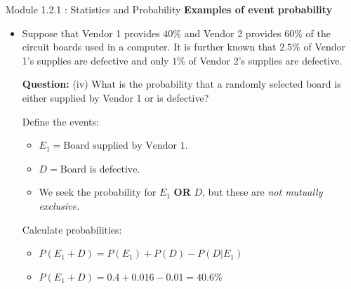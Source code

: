 \documentclass{beamer}
\begin{document}
\begin{frame}{Module 1.2.1 : Statistics and Probability}
\small
\textbf{Examples of event probability}
\begin{itemize}
\item
\scriptsize
Suppose that Vendor 1 provides $40\%$ and Vendor 2 provides $60\%$ of the
circuit boards used in a computer. It is further known that $2.5\%$ of
Vendor 1's supplies are defective and only $1\%$ of Vendor 2's supplies
are defective. \\ \vspace{0.25cm}

\textbf{Question:} (iv) What is the probability that a randomly selected board is
either supplied by Vendor 1 or is defective? \\ \vspace{0.25cm}

Define the events:
\begin{itemize}
\scriptsize
\item $E_1 = \text{Board supplied by Vendor 1.}$
\item $D = \text{Board is defective.}$
\item We seek the probability for $E_1$ \textbf{OR} $D$, but these are \textit{not mutually exclusive.}
\end{itemize}
Calculate probabilities:
\begin{itemize}
\scriptsize
\item $P(E_1 + D) = P(E_1) + P(D) - P(D|E_1)$
\item $P(E_1 + D) = 0.4 + 0.016 - 0.01 = 40.6\%$
\end{itemize}
\end{itemize}
\end{frame}
\end{document}

